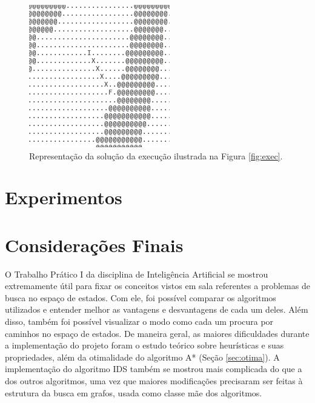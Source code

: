 \documentclass[12pt]{article}
\begin{document}
\begin{figure}[htp!]
	\begin{center}
	  \includegraphics[scale=0.8]{mapex.png}
	\end{center}
	\caption{Representação da solução da execução ilustrada na Figura \ref{fig:exec}.}
	\label{fig:mapex}
\end{figure}

\section{Experimentos}


\section{Considerações Finais}

O Trabalho Prático I da disciplina de Inteligência Artificial se mostrou extremamente útil para fixar os conceitos vistos em sala referentes a problemas de busca no espaço de estados. Com ele, foi possível comparar os algoritmos utilizados e entender melhor as vantagens e desvantagens de cada um deles. Além disso, também foi possível visualizar o modo como cada um procura por caminhos no espaço de estados. De maneira geral, as maiores dificuldades durante a implementação do projeto foram o estudo teórico sobre heurísticas e suas propriedades, além da otimalidade do algoritmo A* (Seção \ref{sec:otima}). A implementação do algoritmo IDS também se mostrou mais complicada do que a dos outros algoritmos, uma vez que maiores modificações precisaram ser feitas à estrutura da busca em grafos, usada como classe mãe dos algoritmos.



\end{document}
